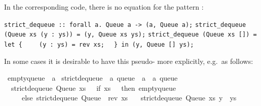 \begin{isabellebody}
{\isafoldquoteme}%
%
\isadelimquoteme
%
\endisadelimquoteme
%
\begin{isamarkuptext}%
\noindent In the corresponding code, there is no equation
  for the pattern :%
\end{isamarkuptext}%
\isamarkuptrue%
%
\isadelimquoteme
%
\endisadelimquoteme
%
\isatagquoteme
%
\begin{isamarkuptext}%
\isaverbatim%
\noindent%
\verb|strict_dequeue :: forall a. Queue a -> (a, Queue a);|\newline%
\verb|strict_dequeue (Queue xs (y : ys)) = (y, Queue xs ys);|\newline%
\verb|strict_dequeue (Queue xs []) =|\newline%
\verb|  let {|\newline%
\verb|    (y : ys) = rev xs;|\newline%
\verb|  } in (y, Queue [] ys);|%
\end{isamarkuptext}%
\isamarkuptrue%
%
\endisatagquoteme
{\isafoldquoteme}%
%
\isadelimquoteme
%
\endisadelimquoteme
%
\begin{isamarkuptext}%
\noindent In some cases it is desirable to have this
  pseudo- more explicitly, e.g.~as follows:%
\end{isamarkuptext}%
\isamarkuptrue%
%
\isadelimquoteme
%
\endisadelimquoteme
%
\isatagquoteme
{}\isamarkupfalse%
\ empty{\isacharunderscore}queue\ {\isacharcolon}{\isacharcolon}\ {\isacharprime}a\isanewline
\isanewline
{}\isamarkupfalse%
\ strict{\isacharunderscore}dequeue{\isacharprime}\ {\isacharcolon}{\isacharcolon}\ {\isachardoublequoteopen}{\isacharprime}a\ queue\ {\isasymRightarrow}\ {\isacharprime}a\ {\isasymtimes}\ {\isacharprime}a\ queue{\isachardoublequoteclose}\ \isanewline
\ \ {\isachardoublequoteopen}strict{\isacharunderscore}dequeue{\isacharprime}\ {\isacharparenleft}Queue\ xs\ {\isacharbrackleft}{\isacharbrackright}{\isacharparenright}\ {\isacharequal}\ {\isacharparenleft}if\ xs\ {\isacharequal}\ {\isacharbrackleft}{\isacharbrackright}\ then\ empty{\isacharunderscore}queue\isanewline
\ \ \ \ \ else\ strict{\isacharunderscore}dequeue{\isacharprime}\ {\isacharparenleft}Queue\ {\isacharbrackleft}{\isacharbrackright}\ {\isacharparenleft}rev\ xs{\isacharparenright}{\isacharparenright}{\isacharparenright}{\isachardoublequoteclose}\isanewline
\ \ {\isacharbar}\ {\isachardoublequoteopen}strict{\isacharunderscore}dequeue{\isacharprime}\ {\isacharparenleft}Queue\ xs\ {\isacharparenleft}y\ {\isacharhash}\ ys{\isacharparenright}{\isacharparenright}\ {\isacharequal}\isanewline

\end{isabellebody}

